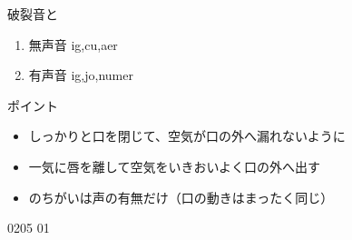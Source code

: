 \documentclass[aspectratio=169, xcolor={dvipsnames,table}]{beamer}
\begin{document}
\begin{frame}[plain,label=slide_p_b]{破裂音と}

  \large

  \begin{enumerate}
    \item 無声音 \hspace{20pt}ig,\hspace{1\zw}cu,\hspace{1\zw}aer

    \item 有声音 \hspace{20pt}ig,\hspace{1\zw}jo,\hspace{1\zw}numer
  \end{enumerate}

  \vspace*{20pt}

  \normalsize ポイント

  \begin{itemize}
    [circle]

    \item しっかりと口を閉じて、空気が口の外へ漏れないように

    \item 一気に唇を離して空気をいきおいよく口の外へ出す

    \item {}のちがいは声の有無だけ（口の動きはまったく同じ）
  \end{itemize}

  \bigskip


  \hfill{\tiny 0205}\,{\scriptsize {}\,01}
\end{frame}
\end{document}
